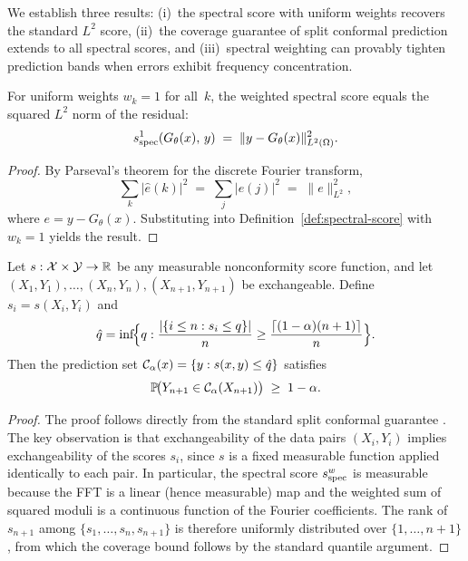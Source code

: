 We establish three results: (i)~the spectral score with uniform weights
recovers the standard $L^2$ score, (ii)~the coverage guarantee of split
conformal prediction extends to all spectral scores, and (iii)~spectral
weighting can provably tighten prediction bands when errors exhibit
frequency concentration.

\begin{theorem}
\label{thm:parseval}
For uniform weights $w_k = 1$ for all~$k$, the weighted spectral score
equals the squared $L^2$ norm of the residual:
\begin{equation}
  s_{\mathrm{spec}}^{1}(G_\theta(x),\, y)
  \;=\;
  \|y - G_\theta(x)\|_{L^2(\Omega)}^2.
\end{equation}
\end{theorem}

\begin{proof}
By Parseval's theorem for the discrete Fourier transform,
\begin{equation}
  \sum_{k} \bigl|\hat{e}(k)\bigr|^2
  \;=\;
  \sum_{j} \bigl|e(j)\bigr|^2
  \;=\;
  \|e\|_{L^2}^2,
\end{equation}
where $e = y - G_\theta(x)$.  Substituting into
Definition~\ref{def:spectral-score} with $w_k = 1$ yields the result.
\end{proof}

\begin{theorem}
\label{thm:coverage}
Let $s : \mathcal{X} \times \mathcal{Y} \to \mathbb{R}$ be any measurable nonconformity score
function, and let $(X_1, Y_1), \dots, (X_n, Y_n), (X_{n+1}, Y_{n+1})$
be exchangeable.  Define $s_i = s(X_i, Y_i)$ and
\begin{equation}
  \hat{q} = \inf\!\Bigl\{q : \frac{|\{i \leq n : s_i \leq q\}|}{n}
    \geq \frac{\lceil (1-\alpha)(n+1) \rceil}{n}\Bigr\}.
\end{equation}
Then the prediction set $\mathcal{C}_\alpha(x) = \{y : s(x,y) \leq \hat{q}\}$
satisfies
\begin{equation}
  \mathbb{P}\!\bigl(Y_{n+1} \in \mathcal{C}_\alpha(X_{n+1})\bigr)
  \;\geq\;
  1 - \alpha.
\end{equation}
\end{theorem}

\begin{proof}
The proof follows directly from the standard split conformal guarantee
\citep{vovk2005algorithmic,lei2018distribution}.  The key observation is
that exchangeability of the data pairs $(X_i, Y_i)$ implies
exchangeability of the scores $s_i$, since $s$ is a fixed measurable
function applied identically to each pair.  In particular, the spectral
score $s_{\mathrm{spec}}^{w}$ is measurable because the FFT is a linear (hence
measurable) map and the weighted sum of squared moduli is a continuous
function of the Fourier coefficients.  The rank of $s_{n+1}$ among
$\{s_1, \dots, s_n, s_{n+1}\}$ is therefore uniformly distributed over
$\{1, \dots, n+1\}$, from which the coverage bound follows by the
standard quantile argument.
\end{proof}

